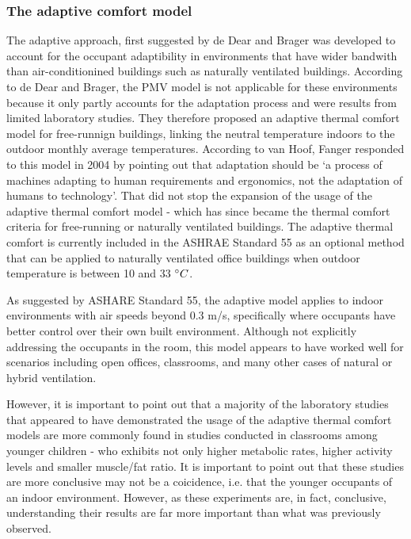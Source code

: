 \subsubsection{The adaptive comfort model}
    The adaptive approach, first suggested by de Dear and Brager \cite{de_dear_developing_1998} was developed to account for the occupant adaptibility in environments that have wider bandwith than air-conditionined buildings such as naturally ventilated buildings. According to de Dear and Brager, the PMV model is not applicable for these environments because it only partly accounts for the adaptation process and were results from limited laboratory studies. They therefore proposed an adaptive thermal comfort model for free-runnign buildings, linking the neutral temperature indoors to the outdoor monthly average temperatures. According to van Hoof, Fanger responded to this model in 2004 by pointing out that adaptation should be `a process of machines adapting to human requirements and ergonomics, not the adaptation of humans to technology'\cite{van_hoof_forty_2008}. That did not stop the expansion of the usage of the adaptive thermal comfort model - which has since became the thermal comfort criteria for free-running or naturally ventilated buildings. The adaptive thermal comfort is currently included in the ASHRAE Standard 55 \cite{ansi/ashrae_standard_2017} as an optional method that can be applied to naturally ventilated office buildings when outdoor temperature is between 10 and 33 $\degree C$. %

	As suggested by ASHARE Standard 55, the adaptive model applies to indoor environments with air speeds beyond 0.3 m/s, specifically where occupants have better control over their own built environment. Although not explicitly addressing the occupants in the room, this model appears to have worked well for scenarios including open offices, classrooms, and many other cases of natural or hybrid ventilation. 
    
	However, it is important to point out that a majority of the laboratory studies that appeared to have demonstrated the usage of the adaptive thermal comfort models are more commonly found in studies conducted in classrooms among younger children - who exhibits not only higher metabolic rates, higher activity levels and smaller muscle/fat ratio. It is important to point out that these studies are more conclusive may not be a coicidence, i.e. that the younger occupants of an indoor environment. However, as these experiments are, in fact, conclusive, understanding their results are far more important than what was previously observed. %

